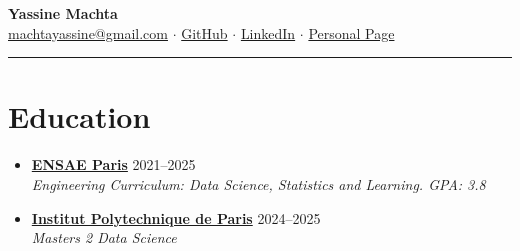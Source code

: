 \documentclass[letterpaper,11pt,twocolumn]{article}
\newcommand{\resumeSubheading}[4]{
  \vspace{-2pt}\item \textbf{#1} \hfill #2 \\
  \textit{\small #3} \hfill \textit{\small #4} 
  \vspace{-7pt}
}
\begin{document}
\begin{center}
  {\LARGE \textbf{Yassine Machta}} \\[5pt]
   \href{mailto:machtayassine@gmail.com}{machtayassine@gmail.com} $\cdot$ 
   \href{https://github.com/MachtaYassine}{GitHub} $\cdot$ 
   \href{https://www.linkedin.com/in/yassine-machta-a00307206/}{LinkedIn} $\cdot$ 
   \href{https://machtayassine.github.io}{Personal Page}
\end{center}

\vspace{-10pt}
\hrule
\vspace{-10pt}

\section{Education}
\begin{itemize}[leftmargin=*]
  \resumeSubheading
    {\href{https://www.ensae.fr/en}{ENSAE Paris}}{2021--2025}
    {Engineering Curriculum: Data Science, Statistics and Learning. GPA: 3.8}{}
  \resumeSubheading
    {\href{https://www.ip-paris.fr/}{Institut Polytechnique de Paris}}{2024--2025}
    {Masters 2 Data Science}{}
\end{itemize}

\end{document}
